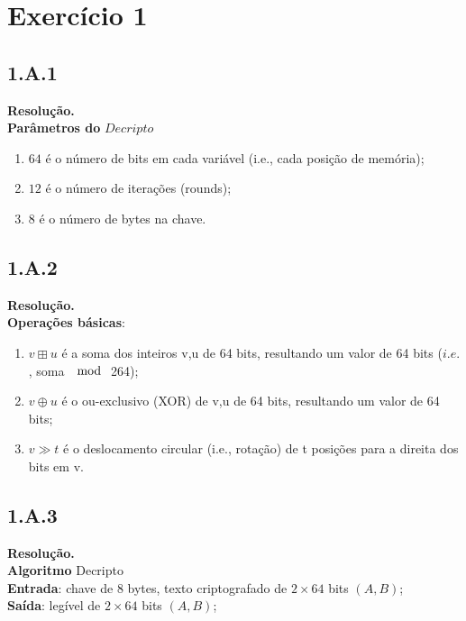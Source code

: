 \documentclass[12pt,letterpaper]{article}
\newcommand\answer{\textbf{Resolução.}\xspace}
\begin{document}
\section*{Exercício 1}
\subsection*{1.A.1}
\answer \\
    \textbf{Parâmetros do} $Decripto$ \\

\begin{enumerate}
    \item $64$ é o número de bits em cada variável (i.e., cada posição de memória);
    \item $12$ é o número de iterações (rounds);
    \item $8$ é o número de bytes na chave.

\end{enumerate}

\subsection*{1.A.2}
\answer \\
    \textbf{Operações básicas}:

\begin{enumerate}
    \item $v \boxplus u$ é a soma dos inteiros v,u de 64 bits, resultando um valor de 64 bits ($i.e.$, soma $\mod$ 264);
    \item $v \oplus u$ é o ou-exclusivo (XOR) de v,u de 64 bits, resultando um valor de 64 bits;
    \item $v \gg t$ é o deslocamento circular (i.e., rotação) de t posições para a direita dos bits em v.
\end{enumerate}

\subsection*{1.A.3}
\answer \\
    \textbf{Algoritmo} Decripto \\
    \textbf{Entrada}: chave de 8 bytes, texto criptografado de $2 \times 64$ bits $(A, B)$; \\
    \textbf{Saída}: legível de $2 \times 64$ bits $(A, B)$; \\
\end{document}
